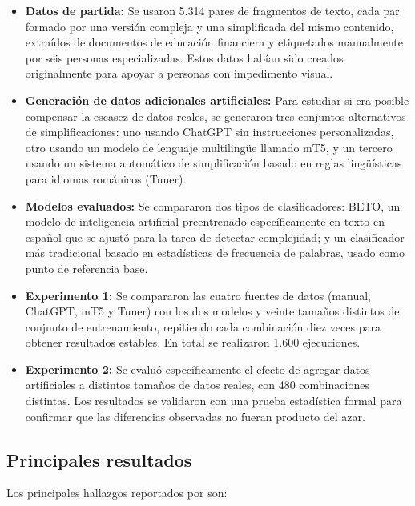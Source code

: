 \begin{itemize}
    \item \textbf{Datos de partida:} Se usaron 5.314 pares de fragmentos de texto, cada par formado por una versión compleja y una simplificada del mismo contenido, extraídos de documentos de educación financiera y etiquetados manualmente por seis personas especializadas. Estos datos habían sido creados originalmente para apoyar a personas con impedimento visual.

    \item \textbf{Generación de datos adicionales artificiales:} Para estudiar si era posible compensar la escasez de datos reales, se generaron tres conjuntos alternativos de simplificaciones: uno usando ChatGPT sin instrucciones personalizadas, otro usando un modelo de lenguaje multilingüe llamado mT5, y un tercero usando un sistema automático de simplificación basado en reglas lingüísticas para idiomas románicos (Tuner).

    \item \textbf{Modelos evaluados:} Se compararon dos tipos de clasificadores: BETO, un modelo de inteligencia artificial preentrenado específicamente en texto en español que se ajustó para la tarea de detectar complejidad; y un clasificador más tradicional basado en estadísticas de frecuencia de palabras, usado como punto de referencia base.

    \item \textbf{Experimento 1:} Se compararon las cuatro fuentes de datos (manual, ChatGPT, mT5 y Tuner) con los dos modelos y veinte tamaños distintos de conjunto de entrenamiento, repitiendo cada combinación diez veces para obtener resultados estables. En total se realizaron 1.600 ejecuciones.

    \item \textbf{Experimento 2:} Se evaluó específicamente el efecto de agregar datos artificiales a distintos tamaños de datos reales, con 480 combinaciones distintas. Los resultados se validaron con una prueba estadística formal para confirmar que las diferencias observadas no fueran producto del azar.
\end{itemize}

\subsection{Principales resultados}

Los principales hallazgos reportados por \cite{romero2024} son:

